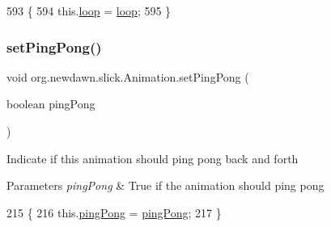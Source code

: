 \begin{DoxyCode}
593                                          \{
594         this.\mbox{\hyperlink{classorg_1_1newdawn_1_1slick_1_1_animation_a44dd0ed98069bf4295965b8449362054}{loop}} = \mbox{\hyperlink{classorg_1_1newdawn_1_1slick_1_1_animation_a44dd0ed98069bf4295965b8449362054}{loop}};
595     \}
\end{DoxyCode}
\mbox{\label{classorg_1_1newdawn_1_1slick_1_1_animation_aabdefa9397f19d852b66975d0680f312}} 
\subsubsection{\texorpdfstring{set\+Ping\+Pong()}{setPingPong()}}
{\footnotesize\ttfamily void org.\+newdawn.\+slick.\+Animation.\+set\+Ping\+Pong (\begin{DoxyParamCaption}\item[{boolean}]{ping\+Pong }\end{DoxyParamCaption})\hspace{0.3cm}{\ttfamily [inline]}}

Indicate if this animation should ping pong back and forth


\begin{DoxyParams}{Parameters}
{\em ping\+Pong} & True if the animation should ping pong \\
\hline
\end{DoxyParams}

\begin{DoxyCode}
215                                               \{
216         this.\mbox{\hyperlink{classorg_1_1newdawn_1_1slick_1_1_animation_a6000f29f3e58e0470e2178e69345c027}{pingPong}} = \mbox{\hyperlink{classorg_1_1newdawn_1_1slick_1_1_animation_a6000f29f3e58e0470e2178e69345c027}{pingPong}};
217     \}
\end{DoxyCode}
\mbox{\label{classorg_1_1newdawn_1_1slick_1_1_animation_a555e7cb21b9be341c41df7dd27323440}} 
